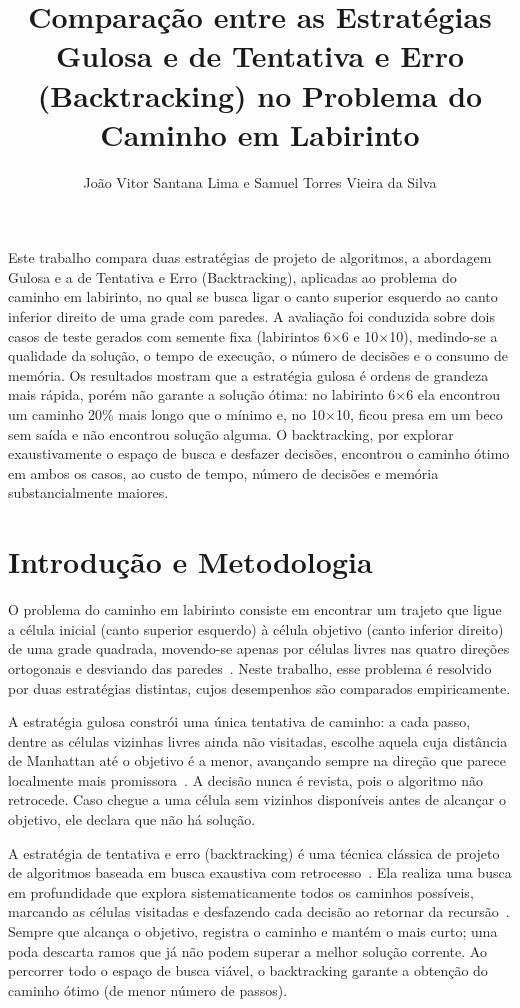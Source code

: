 \documentclass[12pt, a4paper, brazil]{article}
\title{Comparação entre as Estratégias Gulosa e de Tentativa e Erro (Backtracking) no Problema do Caminho em Labirinto}
\author{João Vitor Santana Lima e Samuel Torres Vieira da Silva}
\begin{document}
\maketitle

\begin{resumo}
Este trabalho compara duas estratégias de projeto de algoritmos, a abordagem Gulosa e a de Tentativa e Erro (Backtracking), aplicadas ao problema do caminho em labirinto, no qual se busca ligar o canto superior esquerdo ao canto inferior direito de uma grade com paredes. A avaliação foi conduzida sobre dois casos de teste gerados com semente fixa (labirintos 6$\times$6 e 10$\times$10), medindo-se a qualidade da solução, o tempo de execução, o número de decisões e o consumo de memória. Os resultados mostram que a estratégia gulosa é ordens de grandeza mais rápida, porém não garante a solução ótima: no labirinto 6$\times$6 ela encontrou um caminho 20\% mais longo que o mínimo e, no 10$\times$10, ficou presa em um beco sem saída e não encontrou solução alguma. O backtracking, por explorar exaustivamente o espaço de busca e desfazer decisões, encontrou o caminho ótimo em ambos os casos, ao custo de tempo, número de decisões e memória substancialmente maiores.
\end{resumo}

\section{Introdução e Metodologia}
O problema do caminho em labirinto consiste em encontrar um trajeto que ligue a célula inicial (canto superior esquerdo) à célula objetivo (canto inferior direito) de uma grade quadrada, movendo-se apenas por células livres nas quatro direções ortogonais e desviando das paredes~\cite{cormen2009}. Neste trabalho, esse problema é resolvido por duas estratégias distintas, cujos desempenhos são comparados empiricamente.

A estratégia gulosa constrói uma única tentativa de caminho: a cada passo, dentre as células vizinhas livres ainda não visitadas, escolhe aquela cuja distância de Manhattan até o objetivo é a menor, avançando sempre na direção que parece localmente mais promissora~\cite{cormen2009}. A decisão nunca é revista, pois o algoritmo não retrocede. Caso chegue a uma célula sem vizinhos disponíveis antes de alcançar o objetivo, ele declara que não há solução.

A estratégia de tentativa e erro (backtracking) é uma técnica clássica de projeto de algoritmos baseada em busca exaustiva com retrocesso~\cite{aho1974design}. Ela realiza uma busca em profundidade que explora sistematicamente todos os caminhos possíveis, marcando as células visitadas e desfazendo cada decisão ao retornar da recursão~\cite{sedgewick2011, weiss2014datastructures}. Sempre que alcança o objetivo, registra o caminho e mantém o mais curto; uma poda descarta ramos que já não podem superar a melhor solução corrente. Ao percorrer todo o espaço de busca viável, o backtracking garante a obtenção do caminho ótimo (de menor número de passos).
\end{document}
